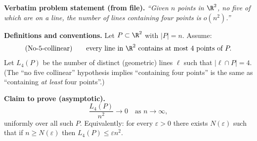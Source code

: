 \noindent\textbf{Verbatim problem statement (from file).}
\emph{``Given $n$ points in $\R^2$, no five of which are on a line, the number of lines containing four points is $o(n^2)$.''}

\medskip
\noindent\textbf{Definitions and conventions.}
Let $P\subset\R^2$ with $|P|=n$.
Assume:
\[\text{(No-5-collinear)}\qquad \text{every line in }\R^2\text{ contains at most 4 points of }P.
\]
Let $L_4(P)$ be the number of distinct (geometric) lines $\ell$ such that $|\ell\cap P|=4$.
(The ``no five collinear'' hypothesis implies ``containing four points'' is the same as ``containing \emph{at least} four points''.)

\medskip
\noindent\textbf{Claim to prove (asymptotic).}
\[\frac{L_4(P)}{n^2}\to 0\quad\text{as }n\to\infty,\]
uniformly over all such $P$.
Equivalently: for every $\varepsilon>0$ there exists $N(\varepsilon)$ such that if $n\ge N(\varepsilon)$ then $L_4(P)\le \varepsilon n^2$.
